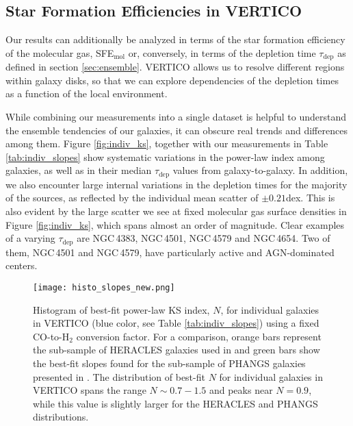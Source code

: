 \documentclass[longauth]{aa}
\begin{document}
\subsection{Star Formation Efficiencies in VERTICO}
\label{sec:sfe}
Our results can additionally be analyzed in terms of the star formation efficiency of the molecular gas, SFE$_\mathrm{mol}$ or, conversely, in terms of the depletion time $\tau_{\mathrm{dep}}$ as defined in section \ref{sec:ensemble}. VERTICO allows us to resolve different regions within galaxy disks, so that we can explore dependencies of the depletion times as a function of the local environment. 


While combining our measurements into a single dataset is helpful to understand the ensemble tendencies of our galaxies, it can obscure real trends and differences among them. Figure \ref{fig:indiv_ks}, together with our measurements in Table \ref{tab:indiv_slopes} show systematic variations in the power-law index among galaxies, as well as in their median $\tau_\textrm{dep}$ values from galaxy-to-galaxy. In addition, we also encounter large internal variations in the depletion times for the majority of the sources, as reflected by the individual mean scatter of $\pm0.21$dex. This is also evident by the large scatter we see at fixed molecular gas surface densities in Figure \ref{fig:indiv_ks}, which spans almost an order of magnitude. Clear examples of a varying $\tau_\textrm{dep}$ are NGC\,4383, NGC\,4501, NGC\,4579 and NGC\,4654. Two of them, NGC\,4501 and NGC\,4579, have particularly active and AGN-dominated centers.

\begin{figure}[ht]
\centering
\texttt{[image: histo\_slopes\_new.png]}
\caption{Histogram of best-fit power-law KS index, $N$, for individual galaxies in VERTICO (blue color, see Table \ref{tab:indiv_slopes}) using a fixed CO-to-H$_2$ conversion factor. For a comparison, orange bars represent the sub-sample of HERACLES galaxies used in \citet{Leroy2013} and green bars show the best-fit slopes found for the sub-sample of PHANGS galaxies presented in \citet{Pessa2021}. The distribution of best-fit $N$ for individual galaxies in VERTICO spans the range $N\sim0.7-1.5$ and peaks near $N=0.9$, while this value is slightly larger for the HERACLES and PHANGS distributions.}
\label{fig:slopes}
\end{figure}
\end{document}
